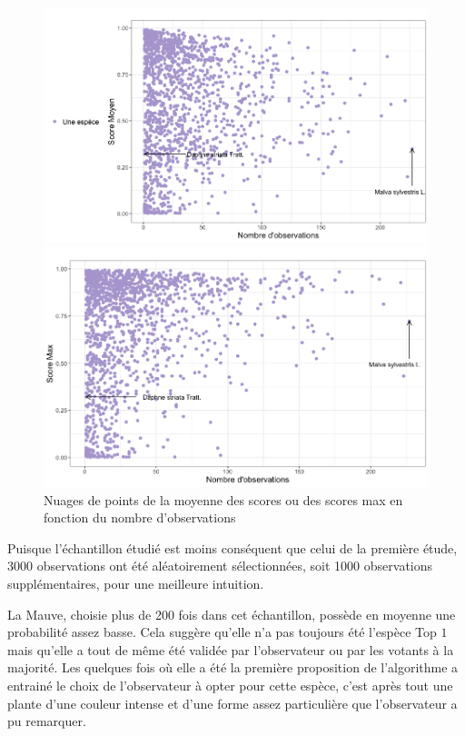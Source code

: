 \documentclass[a4paper,12pt]{article}
\begin{document}
\begin{figure}[H]
    \centering
    \begin{minipage}{0.5\textwidth}
      \includegraphics[width=0.9\linewidth]{images/mean_rd_users.png}
    \end{minipage}%
    \begin{minipage}{0.5\textwidth}
      \includegraphics[width=0.9\linewidth]{images/max_rd_users.png}
    \end{minipage}
    \caption{Nuages de points de la moyenne des scores ou des scores max en fonction du nombre d'observations}
\end{figure}

Puisque l'échantillon étudié est moins conséquent que celui de la première étude, 3000 observations ont été aléatoirement sélectionnées, soit 1000 observations supplémentaires, pour une meilleure intuition. 

\vspace{0.2cm}

La Mauve, choisie plus de 200 fois dans cet échantillon, possède en moyenne une probabilité assez basse. Cela suggère qu'elle n'a pas toujours été l'espèce Top $1$ mais qu'elle a tout de même été validée par l'observateur ou par les votants à la majorité. Les quelques fois où elle a été la première proposition de l'algorithme a entrainé le choix de l'observateur à opter pour cette espèce, c'est après tout une plante d'une couleur intense et d'une forme assez particulière que l'observateur a pu remarquer.
\end{document}
